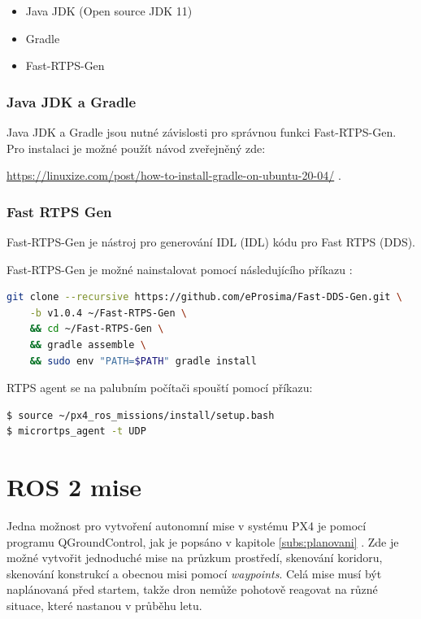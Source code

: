 \begin{itemize}
    \item Java JDK (Open source JDK 11)
    \item Gradle
    \item Fast-RTPS-Gen
\end{itemize}

\subsubsection{Java JDK a Gradle}

Java JDK a Gradle jsou nutné závislosti pro správnou funkci Fast-RTPS-Gen. Pro instalaci je možné použít návod zveřejněný zde: 

\href{https://linuxize.com/post/how-to-install-gradle-on-ubuntu-20-04/}{https://linuxize.com/post/how-to-install-gradle-on-ubuntu-20-04/} \cite{GRADLE}.

\subsubsection{Fast RTPS Gen}

Fast-RTPS-Gen je nástroj pro generování \acs{IDL} (\acl{IDL}) kódu pro Fast RTPS (\acs{DDS}).

Fast-RTPS-Gen je možné nainstalovat pomocí následujícího příkazu \cite{PX4docs}:

\begin{lstlisting}[language=bash]
git clone --recursive https://github.com/eProsima/Fast-DDS-Gen.git \
    -b v1.0.4 ~/Fast-RTPS-Gen \
    && cd ~/Fast-RTPS-Gen \
    && gradle assemble \
    && sudo env "PATH=$PATH" gradle install
\end{lstlisting}

\acs{RTPS} agent se na palubním počítači spouští pomocí příkazu:

\begin{lstlisting}[language=bash]
$ source ~/px4_ros_missions/install/setup.bash
$ micrortps_agent -t UDP
\end{lstlisting}

\section{ROS 2 mise}

Jedna možnost pro vytvoření autonomní mise v systému PX4 je pomocí programu QGroundControl, jak je popsáno v kapitole \ref{subs:planovani} . Zde je možné vytvořit jednoduché mise na průzkum prostředí, skenování koridoru, skenování konstrukcí a obecnou misi pomocí \textit{waypoints}. Celá mise musí být naplánovaná před startem, takže dron nemůže pohotově reagovat na různé situace, které nastanou v průběhu letu. 

